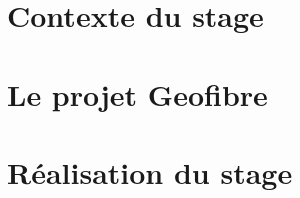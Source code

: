 \documentclass[a4paper, 12pt, onecolumn, openright, oneside]{report}
\begin{document}
  
  
  \setcounter{secnumdepth}{1} %
  \setcounter{tocdepth}{1}  %
  \tableofcontents
  
  \part{Contexte du stage}
  
  
  
  \part{Le projet Geofibre}
  
  \part{Réalisation du stage}
  
  
  
  
  \appendix
  \listoffigures
  
  
\end{document}
